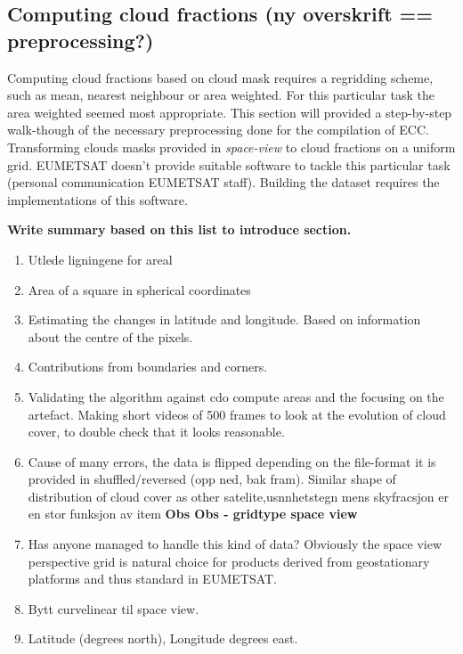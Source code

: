 \subsection{Computing cloud fractions (ny overskrift == preprocessing?)} \label{sec:remapping}

Computing cloud fractions based on cloud mask requires a regridding scheme, such as mean, nearest neighbour or area weighted. For this particular task the area weighted seemed most appropriate. This section will provided a step-by-step walk-though of the necessary preprocessing done for the compilation of ECC. Transforming clouds masks provided in \textit{space-view} to cloud fractions on a uniform grid. EUMETSAT doesn't provide suitable software to tackle this particular task (personal communication EUMETSAT staff). Building the dataset requires the implementations of this software.

\textbf{Write summary based on this list to introduce section.}
\begin{enumerate}
    \item Utlede ligningene for areal
    \item Area of a square in spherical coordinates
    \item Estimating the changes in latitude and longitude. Based on information about the centre of the pixels. 
    \item Contributions from boundaries and corners. 
    \item Validating the algorithm against cdo compute areas and the focusing on the artefact. Making short videos of 500 frames to look at the evolution of cloud cover, to double check that it looks reasonable. 
    \item Cause of many errors, the data is flipped depending on the file-format it is provided in shuffled/reversed (opp ned, bak fram). Similar shape of distribution of cloud cover as other satelite,usnnhetstegn mens skyfracsjon er en stor funksjon av 
    item \textbf{Obs Obs - gridtype space view}
    \item Has anyone managed to handle this kind of data? Obviously the space view perspective grid is natural choice for products derived from geostationary platforms and thus standard in EUMETSAT. 
    \item Bytt curvelinear til space view.
    \item Latitude (degrees north), Longitude degrees east.
\end{enumerate}

